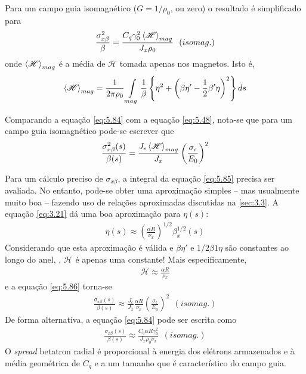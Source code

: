 Para um campo guia isomagnético ($G = 1/\rho_0$, ou zero) o resultado é simplificado para
\begin{align}
	\frac{\sigma_{x\beta}^2}{\beta} = \frac{C_q \gamma_0^2 \left< \mathscr{H} \right>_{mag}}{J_x \rho_0}\ \ (isomag.)\label{eq:5.84}
\end{align}
onde $\left< \mathscr{H} \right>_{mag}$ é a média de $\mathscr{H}$ tomada apenas nos magnetos. Isto é,
\begin{align}
	\left< \mathscr{H} \right>_{mag} = \frac{1}{2 \pi \rho_0}\int\limits_{mag}^{} \frac{1}{\beta}\left\{\eta^2 + \left(\beta \eta' - \frac{1}{2}\beta' \eta\right)^2\right\}ds\label{eq:5.85}
\end{align}

Comparando a equação \eqref{eq:5.84} com a equação \eqref{eq:5.48}, nota-se que para um campo guia isomagnético pode-se escrever que
\begin{align}
	\frac{\sigma_{x\beta}^2(s)}{\beta(s)} = \frac{J_\epsilon \left< \mathscr{H} \right>_{mag}}{J_x}\left(\frac{\sigma_\epsilon}{E_0}\right)^2\label{eq:5.86}
\end{align}

Para um cálculo preciso de $\sigma_{x\beta}$, a integral da equação \eqref{eq:5.85} precisa ser avaliada. No entanto, pode-se obter uma aproximação simples -- mas usualmente muito boa -- fazendo uso de relações aproximadas discutidas na \autoref{sec:3.3}. A equação \eqref{eq:3.21} dá uma boa aproximação para $\eta(s)$:
\begin{align}
	\eta(s) \approx \left(\frac{\alpha R}{\nu_x}\right)^{1/2}\beta_x^{1/2}(s)\label{eq:5.87}
\end{align}
Considerando que esta aproximação é válida e $\beta \eta'$ e $1/2 \beta1 \eta$ são constantes ao longo do anel, , $\mathscr{H}$ é apenas uma constante! Mais especificamente,
\begin{align}
	\mathscr{H} \approx \frac{\alpha R}{\nu_x}\label{eq:5.88}
\end{align}
e a equação \eqref{eq:5.86} torna-se
\begin{align}
	\frac{\sigma_{x\beta}(s)}{\beta(s)} \approx \frac{J_\epsilon}{J_x}\frac{\alpha R}{\nu_x}\left(\frac{\sigma_\epsilon}{E_0}\right)^2\ \ (isomag.)\label{eq:5.89}
\end{align}
De forma alternativa, a equação \eqref{eq:5.84} pode ser escrita como
\begin{align}
	\frac{\sigma_{x\beta}(s)}{\beta(s)} \approx \frac{C_q \alpha R \gamma_0^2}{J_x \rho_0 \nu_x}\ \ (isomag.)
\end{align}
O \textit{spread} betatron radial é proporcional à energia dos elétrons armazenados e à média geométrica de $C_q$ e a um tamanho que é característico do campo guia.

